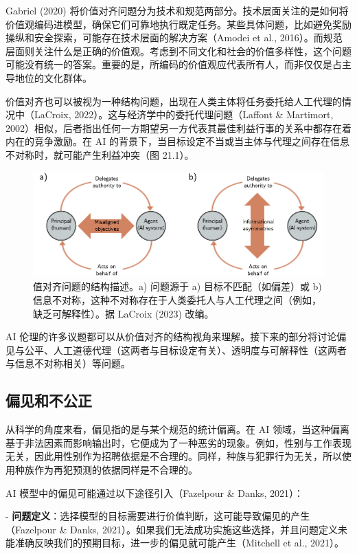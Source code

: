 \documentclass[lang=cn,newtx,10pt,scheme=chinese]{elegantbook}
\begin{document}
Gabriel (2020) 将价值对齐问题分为技术和规范两部分。技术层面关注的是如何将价值观编码进模型，确保它们可靠地执行既定任务。某些具体问题，比如避免奖励操纵和安全探索，可能存在技术层面的解决方案（Amodei et al., 2016）。而规范层面则关注什么是正确的价值观。考虑到不同文化和社会的价值多样性，这个问题可能没有统一的答案。重要的是，所编码的价值观应代表所有人，而非仅仅是占主导地位的文化群体。

价值对齐也可以被视为一种结构问题，出现在人类主体将任务委托给人工代理的情况中（LaCroix, 2022）。这与经济学中的委托代理问题（Laffont \& Martimort, 2002）相似，后者指出任何一方期望另一方代表其最佳利益行事的关系中都存在着内在的竞争激励。在 AI 的背景下，当目标设定不当或当主体与代理之间存在信息不对称时，就可能产生利益冲突（图 21.1）。

\begin{figure}[ht!]
\centering
\includegraphics[width=0.7\linewidth]{PDFFigures/UDLChap20PDF/EthicsStructural.pdf}
\caption{值对齐问题的结构描述。a) 问题源于 a) 目标不匹配（如偏差）或 b) 信息不对称，这种不对称存在于人类委托人与人工代理之间（例如，缺乏可解释性）。据 LaCroix (2023) 改编。}
\end{figure}
  

AI 伦理的许多议题都可以从价值对齐的结构视角来理解。接下来的部分将讨论偏见与公平、人工道德代理（这两者与目标设定有关）、透明度与可解释性（这两者与信息不对称相关）等问题。

\subsection{偏见和不公正}
从科学的角度来看，偏见指的是与某个规范的统计偏离。在 AI 领域，当这种偏离基于非法因素而影响输出时，它便成为了一种恶劣的现象。例如，性别与工作表现无关，因此用性别作为招聘依据是不合理的。同样，种族与犯罪行为无关，所以使用种族作为再犯预测的依据同样是不合理的。

AI 模型中的偏见可能通过以下途径引入（Fazelpour \& Danks, 2021）：

- \textbf{问题定义}：选择模型的目标需要进行价值判断，这可能导致偏见的产生（Fazelpour \& Danks, 2021）。如果我们无法成功实施这些选择，并且问题定义未能准确反映我们的预期目标，进一步的偏见就可能产生（Mitchell et al., 2021）。
\end{document}
